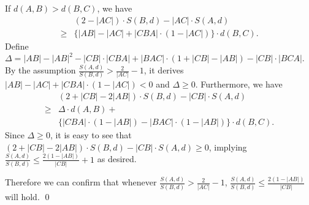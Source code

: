 \documentclass[11pt]{article}
\theoremstyle{remark}
\begin{document}
If $d(A,B)>d(B,C)$, we have
\begin{align*}
& (2-|AC|)\cdot S(B,d)-|AC|\cdot S(A,d)\\
\ge & \{ |AB|-|AC|+|CBA|\cdot (1-|AC|)\} \cdot d(B,C).
\end{align*}
Define $\Delta=|AB|-|AB|^2-|CB|\cdot |CBA|+|BAC|\cdot (1+|CB|-|AB|)-|CB|\cdot |BCA|$. By the assumption $\frac{S(A,d)}{S(B,d)}>\frac{2}{|AC|}-1$, it derives $|AB|-|AC|+|CBA|\cdot (1-|AC|)<0$ and $\Delta\ge 0$.
 Furthermore, we have
\begin{align*}
& (2+|CB|-2|AB|)\cdot S(B,d)-|CB|\cdot S(A,d)\\
\ge & \Delta \cdot d(A,B)+\\
 & \{ |CBA|\cdot (1-|AB|)-|BAC|\cdot (1-|AB|) \}\cdot d(B,C).
\end{align*}
Since $\Delta\ge 0$, it is easy to see that
 $(2+|CB|-2|AB|)\cdot S(B,d)-|CB|\cdot S(A,d)\ge 0$, implying $\frac{S(A,d)}{S(B,d)}\le \frac{2(1-|AB|)}{|CB|} + 1$ as desired.


 Therefore we can confirm that whenever $\frac{S(A,d)}{S(B,d)}>\frac{2}{|AC|}-1$, $\frac{S(A,d)}{S(B,d)}\le \frac{2(1-|AB|)}{|CB|}$ will hold.
 \qed
\end{document}
